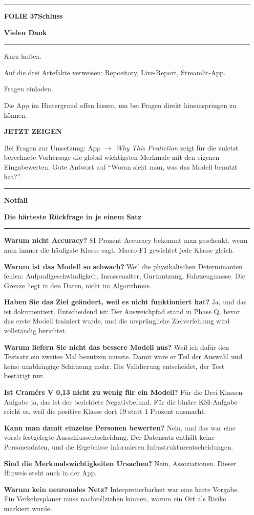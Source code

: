 \documentclass[9pt]{extarticle}
\newcommand{\karte}[3]{%
  \clearpage
  {\color{Accent}\rule{\linewidth}{2.4pt}}\par\vspace{2.5pt}
  {\fontsize{8}{9}\selectfont\bfseries\color{Accent}%
   FOLIE #1\hspace{1.2em}\textbar\hspace{1.2em}#2}\par\vspace{1pt}
  {\fontsize{16}{18}\selectfont\bfseries\color{AccentDark}#3}\par\vspace{3pt}
  {\color{Accent!45}\rule{\linewidth}{0.5pt}}\par\vspace{4pt}%
}
\newcommand{\metakarte}[2]{%
  \clearpage
  {\color{AccentDark}\rule{\linewidth}{2.4pt}}\par\vspace{2.5pt}
  {\fontsize{8}{9}\selectfont\bfseries\color{AccentDark}#1}\par\vspace{1pt}
  {\fontsize{16}{18}\selectfont\bfseries\color{AccentDark}#2}\par\vspace{3pt}
  {\color{Accent!45}\rule{\linewidth}{0.5pt}}\par\vspace{4pt}%
}
\newcommand{\rubrik}[1]{%
  \vspace{3.5pt}{\fontsize{7.5}{8.5}\selectfont\bfseries\color{Grau}%
  \MakeUppercase{#1}}\par\vspace{1.5pt}}
\newcommand{\zeigen}[1]{%
  \begin{tcolorbox}[enhanced,sharp corners,boxrule=0pt,
    leftrule=2.2pt,colframe=Demo,colback=DemoPale,
    left=5pt,right=5pt,top=3.5pt,bottom=3.5pt,before skip=3pt,after skip=2pt]
    {\fontsize{7.5}{8.5}\selectfont\bfseries\color{Demo}JETZT ZEIGEN}\par\vspace{2pt}
    #1
  \end{tcolorbox}}
\newcommand{\frage}[2]{\item \textbf{\color{AccentDark}#1} #2}
\begin{document}
\karte{37}{Schluss}{Vielen Dank}

\rubrik{Sagen}
\begin{sag}
  \item Kurz halten.
  \item Auf die drei Artefakte verweisen: Repository, Live-Report, Streamlit-App.
  \item Fragen einladen.
  \item Die App im Hintergrund offen lassen, um bei Fragen direkt hineinspringen zu können.
\end{sag}

\zeigen{Bei Fragen zur Umsetzung: App $\rightarrow$ \textit{Why This Prediction} zeigt für die
zuletzt berechnete Vorhersage die global wichtigsten Merkmale mit den eigenen Eingabewerten.
Gute Antwort auf \enquote{Woran sieht man, was das Modell benutzt hat?}.}

\metakarte{Notfall}{Die härteste Rückfrage in je einem Satz}

\begin{begriff}
  \frage{Warum nicht Accuracy?}{81 Prozent Accuracy bekommt man geschenkt, wenn man immer die
    häufigste Klasse sagt. Macro-F1 gewichtet jede Klasse gleich.}
  \frage{Warum ist das Modell so schwach?}{Weil die physikalischen Determinanten fehlen:
    Aufprallgeschwindigkeit, Insassenalter, Gurtnutzung, Fahrzeugmasse. Die Grenze liegt in den
    Daten, nicht im Algorithmus.}
  \frage{Haben Sie das Ziel geändert, weil es nicht funktioniert hat?}{Ja, und das ist
    dokumentiert. Entscheidend ist: Der Ausweichpfad stand in Phase Q, bevor das erste Modell
    trainiert wurde, und die ursprüngliche Zielverfehlung wird vollständig berichtet.}
  \frage{Warum liefern Sie nicht das bessere Modell aus?}{Weil ich dafür den Testsatz ein zweites
    Mal benutzen müsste. Damit wäre er Teil der Auswahl und keine unabhängige Schätzung mehr.
    Die Validierung entscheidet, der Test bestätigt nur.}
  \frage{Ist Cram\'ers V 0,13 nicht zu wenig für ein Modell?}{Für die Drei-Klassen-Aufgabe ja,
    das ist der berichtete Negativbefund. Für die binäre KSI-Aufgabe reicht es, weil die
    positive Klasse dort 19 statt 1 Prozent ausmacht.}
  \frage{Kann man damit einzelne Personen bewerten?}{Nein, und das war eine vorab festgelegte
    Ausschlussentscheidung. Der Datensatz enthält keine Personendaten, und die Ergebnisse
    informieren Infrastrukturentscheidungen.}
  \frage{Sind die Merkmalswichtigkeiten Ursachen?}{Nein, Assoziationen. Dieser Hinweis steht auch
    in der App.}
  \frage{Warum kein neuronales Netz?}{Interpretierbarkeit war eine harte Vorgabe. Ein
    Verkehrsplaner muss nachvollziehen können, warum ein Ort als Risiko markiert wurde.}
\end{begriff}
\end{document}
